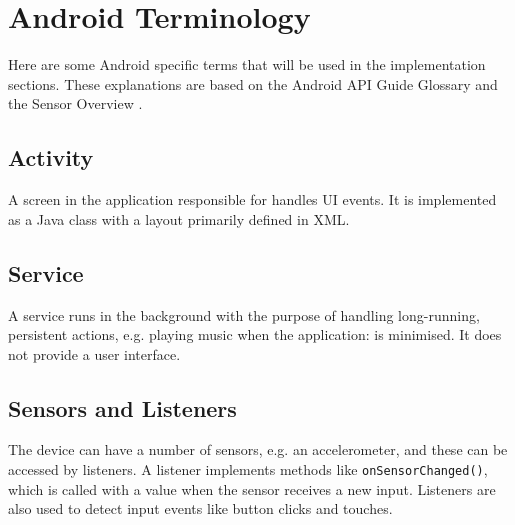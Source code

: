 \section{Android Terminology}
Here are some Android specific terms that will be used in the implementation sections. These explanations are based on the Android API Guide Glossary \citep{android:terms} and the Sensor Overview \citep{android:sensor}.

\subsection*{Activity}
A screen in the application responsible for handles UI events. It is implemented as a Java class with a layout primarily defined in XML.


\subsection*{Service}
A service runs in the background with the purpose of handling long-running, persistent actions, e.g. playing music when the application: is minimised. It does not provide a user interface.

\subsection*{Sensors and Listeners}
The device can have a number of sensors, e.g. an accelerometer, and these can be accessed by listeners. A listener implements methods like \texttt{onSensorChanged()}, which is called with a value when the sensor receives a new input. Listeners are also used to detect input events like button clicks and touches.
